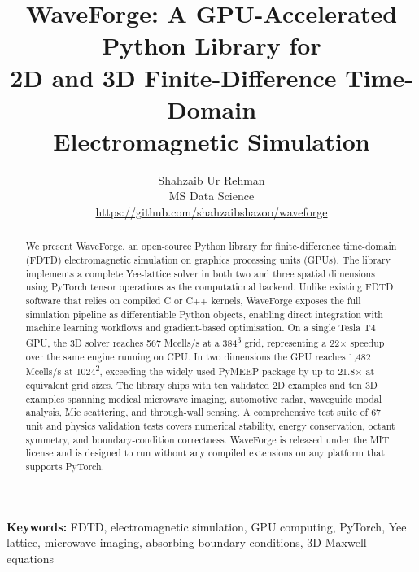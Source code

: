 \documentclass[10pt,twocolumn]{article}
\begin{document}
\title{WaveForge: A GPU-Accelerated Python Library for\\
2D and 3D Finite-Difference Time-Domain\\
Electromagnetic Simulation}

\author{
  Shahzaib Ur Rehman\\
  \small MS Data Science\\
  \small \url{https://github.com/shahzaibshazoo/waveforge}
}
\date{}

\maketitle

\begin{abstract}
We present WaveForge, an open-source Python library for finite-difference
time-domain (FDTD) electromagnetic simulation on graphics processing units
(GPUs). The library implements a complete Yee-lattice solver in both two and
three spatial dimensions using PyTorch tensor operations as the computational
backend. Unlike existing FDTD software that relies on compiled C or C++
kernels, WaveForge exposes the full simulation pipeline as differentiable
Python objects, enabling direct integration with machine learning workflows
and gradient-based optimisation. On a single Tesla T4 GPU, the 3D solver
reaches 567 Mcells/s at a 384\textsuperscript{3} grid, representing a 22$\times$
speedup over the same engine running on CPU. In two dimensions the GPU reaches
1{,}482 Mcells/s at 1024\textsuperscript{2}, exceeding the widely used PyMEEP
package by up to 21.8$\times$ at equivalent grid sizes. The library ships with
ten validated 2D examples and ten 3D examples spanning medical microwave
imaging, automotive radar, waveguide modal analysis, Mie scattering, and
through-wall sensing. A comprehensive test suite of 67 unit and physics
validation tests covers numerical stability, energy conservation, octant
symmetry, and boundary-condition correctness. WaveForge is released under
the MIT license and is designed to run without any compiled extensions on
any platform that supports PyTorch.
\end{abstract}

\noindent\textbf{Keywords:} FDTD, electromagnetic simulation, GPU computing, PyTorch, Yee lattice,
microwave imaging, absorbing boundary conditions, 3D Maxwell equations

\vspace{4pt}
\end{document}
